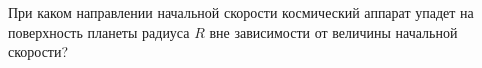 При каком направлении начальной скорости космический аппарат упадет на поверхность планеты радиуса $R$ вне зависимости 
от величины начальной скорости?

